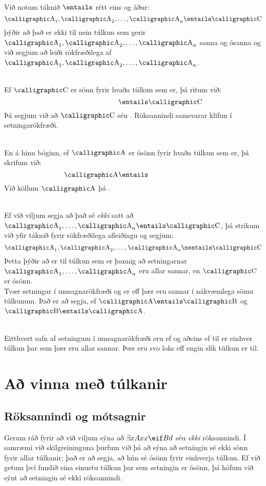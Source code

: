 \
\\Við notum táknið $\entails$ rétt eins og áður:
	$$\meta{A}_1, \meta{A}_2, \ldots, \meta{A}_n \entails{}$$
þýðir að það er ekki til nein túlkun sem gerir $\meta{A}_1, \meta{A}_2, \ldots, \meta{A}_n$  sanna og  ósanna og við segjum að \meta{C} leiði rökfræðilega af $\meta{A}_1, \meta{A}_2, \ldots, \meta{A}_n$.

\
\\Ef $\meta{C}$ er sönn fyrir hvaða túlkun sem er, þá ritum við:
	$$\phantom{\meta{A}} \entails\meta{C}$$
Þá segjum við að $\meta{C}$ séu \define{röksannindi}. Röksannindi samsvarar klifun í setningarökfræði.

\
\\En á hinn bóginn, ef $\meta{A}$ er ósönn fyrir hvaða túlkun sem er, þá skrifum við:
$$\meta{A} \entails \phantom{\meta{C}}$$
Við köllum $\meta{A}$ þá .

\
\\
Ef við viljum segja að það sé \emph{ekki} satt að $_1, \ldots, \meta{A}_n \entails \meta{C}$, þá strikum við yfir táknið fyrir rökfræðilega afleiðingu og segjum: 
$$\meta{A}_1, \meta{A}_2, \ldots, \meta{A}_n \nentails\meta{C}$$
Þetta þýðir að er til túlkun sem er þannig að setningarnar $\meta{A}_1,\ldots, \meta{A}_n$ eru allar sannar, en $\meta{C}$ er ósönn.
\
\\Tvær setningar í umsagnarökfræði \meta{A} og  er  eff þær eru sannar í nákvæmlega sömu túlkunum. Það er að segja, ef $\meta{A}\entails\meta{B}$ og $\meta{B}\entails\meta{A}$.

\
\\Eitthvert safn af setningum í umsagnarökfræði eru  ef og aðeins ef til er einhver túlkun þar sem þær eru allar sannar. Þær eru svo loks  eff engin slík túlkun er til.

\chapter{Að vinna með túlkanir}
\label{sec.UsingModels}

\section{Röksannindi og mótsagnir}
Gerum ráð fyrir að við viljum sýna að $\exists xAxx \eif Bd$ séu \emph{ekki} röksannindi. Í samræmi við skilgreininguna þurfum við þá að sýna að setningin sé ekki sönn fyrir allar túlkanir; það er að segja, að hún sé ósönn fyrir einhverja túlkun. Ef við getum því fundið eina einustu túlkun þar sem setningin er ósönn, þá höfum við sýnt að setningin sé ekki röksannindi.

